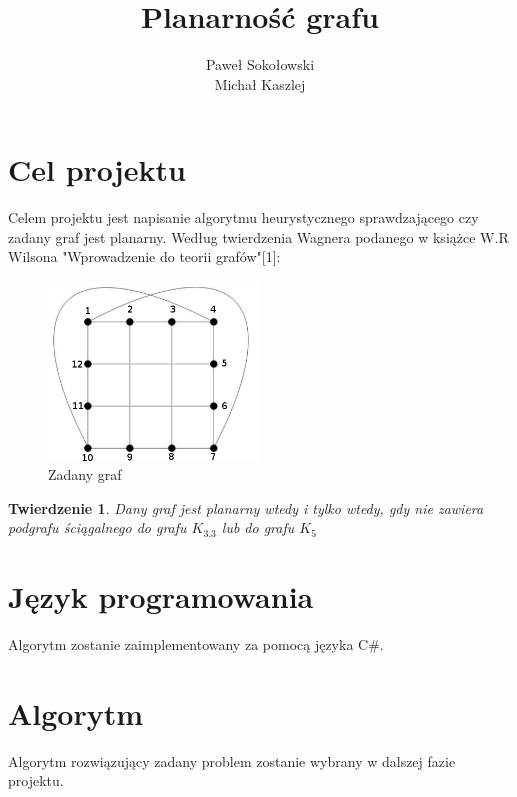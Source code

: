 \documentclass[a4 122pt]{article}
\title{Planarność grafu}
\author{Paweł Sokołowski\\Michał Kaszlej}
\newtheorem{twierdzenie}{Twierdzenie}
\begin{document}
\maketitle

	\section{Cel projektu}

		Celem projektu jest napisanie algorytmu heurystycznego sprawdzającego czy zadany graf jest planarny.
		Według twierdzenia Wagnera podanego w książce W.R Wilsona "Wprowadzenie do teorii grafów"[1]:

		\begin{figure}[h]
			\begin{center}
				\includegraphics[width=0.5\textwidth]{include/graf.png}
				\caption{Zadany graf}
			\end{center}
		\end{figure}




		\begin{twierdzenie}
		Dany graf jest planarny wtedy i tylko wtedy, gdy nie zawiera podgrafu ściągalnego do grafu $K_{3.3}$ lub do grafu $ K_5 $
		\end{twierdzenie}

	\section{Język programowania} 

		Algorytm zostanie zaimplementowany za pomocą języka C\#.

	\section{Algorytm}

		Algorytm rozwiązujący zadany problem zostanie wybrany w dalszej fazie projektu.
\end{document}
